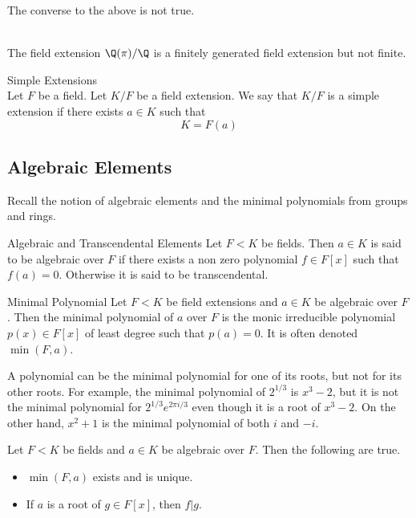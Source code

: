 \documentclass[a4paper]{article}
\begin{document}
The converse to the above is not true. 

\begin{eg}{}{}\\
The field extension $\Q(\pi)/\Q$ is a finitely generated field extension but not finite. 
\end{eg}

\begin{defn}{Simple Extensions}{}\\
Let $F$ be a field. Let $K/F$ be a field extension. We say that $K/F$ is a simple extension if there exists $a\in K$ such that $$K=F(a)$$
\end{defn}

\subsection{Algebraic Elements}
Recall the notion of algebraic elements and the minimal polynomials from groups and rings. 

\begin{defn}{Algebraic and Transcendental Elements}{} Let $F<K$ be fields. Then $a\in K$ is said to be algebraic over $F$ if there exists a non zero polynomial $f\in F[x]$ such that $f(a)=0$. Otherwise it is said to be transcendental. 
\end{defn}

\begin{defn}{Minimal Polynomial}{} Let $F<K$ be field extensions and $a\in K$ be algebraic over $F$. Then the minimal polynomial of $a$ over $F$ is the monic irreducible polynomial $p(x)\in F[x]$ of least degree such that $p(a)=0$. It is often denoted $\min(F,a)$. 
\end{defn}

A polynomial can be the minimal polynomial for one of its roots, but not for its other roots. For example, the minimal polynomial of $2^{1/3}$ is $x^3-2$, but it is not the minimal polynomial for $2^{1/3}e^{2\pi i/3}$ even though it is a root of $x^3-2$. On the other hand, $x^2+1$ is the minimal polynomial of both $i$ and $-i$. 

\begin{prp}{}{} Let $F<K$ be fields and $a\in K$ be algebraic over $F$. Then the following are true. 
\begin{itemize}
\item $\min(F,a)$ exists and is unique. 
\item If $a$ is a root of $g\in F[x]$, then $f|g$. 
\end{itemize}
\end{prp}
\end{document}
